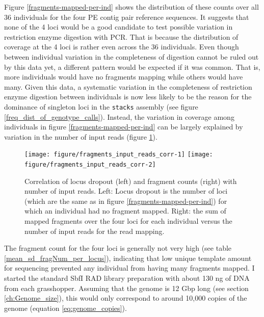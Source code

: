 \documentclass[a4paper,12pt,times,print,index,custombib,custommargin]{PhDThesisPSnPDF}\usepackage[]{graphicx}\usepackage[]{color}
\newenvironment{knitrout}{}{} %
\begin{document}
Figure \ref{fragments-mapped-per-ind} shows the distribution of these counts over all 36 individuals for the four PE contig pair reference sequences. It suggests that none of the 4 loci would be a good candidate to test possible variation in restriction enzyme digestion with PCR. That is because the distribution of coverage at the 4 loci is rather even across the 36 individuals. Even though between individual variation in the completeness of digestion cannot be ruled out by this data yet, a different pattern would be expected if it was common. That is, more individuals would have no fragments mapping while others would have many. Given this data, a systematic variation in the completeness of restriction enzyme digestion between individuals is now less likely to be the reason for the dominance of singleton loci in the \texttt{stacks} assembly (see figure \ref{freq_dist_of_genotype_calls}). Instead, the variation in coverage among individuals in figure \ref{fragments-mapped-per-ind} can be largely explained by variation in the number of input reads (figure \ref{frag_input_corr_fig}).
%
\begin{figure}
\begin{knitrout}
\color{fgcolor}

{\centering \texttt{[image: figure/fragments\_input\_reads\_corr-1]} 
\texttt{[image: figure/fragments\_input\_reads\_corr-2]} 

}



\end{knitrout}
\caption{Correlation of locus dropout (left) and fragment counts (right) with number of input reads. Left: Locus dropout is the number of loci (which are the same as in figure \ref{fragments-mapped-per-ind}) for which an individual had no \gls{fragment} mapped. Right: the sum of mapped \glspl{fragment} over the four loci for each individual versus the number of input reads for the read mapping.}
\label{frag_input_corr_fig}
\end{figure}

The \gls{fragment} count for the four loci is generally not very high (see table \ref{mean_sd_fragNum_per_locus}), indicating that low unique template amount for sequencing prevented any individual from having many fragments mapped. I started the standard SbfI RAD library preparation with about 130 ng of DNA from each grasshopper. Assuming that the genome is 12 Gbp long (see section \ref{ch:Genome_size}), this would only correspond to around 10,000 copies of the genome (equation \ref{eq:genome_copies}).
\end{document}
